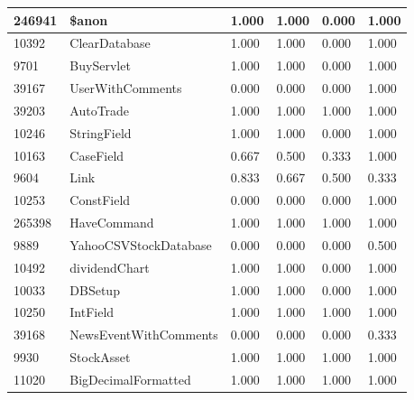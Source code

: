 \documentclass[a4paper]{article}
\newlength{\DUtablewidth} %
\begin{document}
\begin{longtable*}[c]{|p{0.160\DUtablewidth}|p{0.160\DUtablewidth}|p{0.160\DUtablewidth}|p{0.160\DUtablewidth}|p{0.160\DUtablewidth}|p{0.160\DUtablewidth}|}
246941
 & 
\$anon
 & 
1.000
 & 
1.000
 & 
0.000
 & 
1.000
 \\
\hline

10392
 & 
ClearDatabase
 & 
1.000
 & 
1.000
 & 
0.000
 & 
1.000
 \\
\hline

9701
 & 
BuyServlet
 & 
1.000
 & 
1.000
 & 
0.000
 & 
1.000
 \\
\hline

39167
 & 
UserWithComments
 & 
0.000
 & 
0.000
 & 
0.000
 & 
1.000
 \\
\hline

39203
 & 
AutoTrade
 & 
1.000
 & 
1.000
 & 
1.000
 & 
1.000
 \\
\hline

10246
 & 
StringField
 & 
1.000
 & 
1.000
 & 
0.000
 & 
1.000
 \\
\hline

10163
 & 
CaseField
 & 
0.667
 & 
0.500
 & 
0.333
 & 
1.000
 \\
\hline

9604
 & 
Link
 & 
0.833
 & 
0.667
 & 
0.500
 & 
0.333
 \\
\hline

10253
 & 
ConstField
 & 
0.000
 & 
0.000
 & 
0.000
 & 
1.000
 \\
\hline

265398
 & 
HaveCommand
 & 
1.000
 & 
1.000
 & 
1.000
 & 
1.000
 \\
\hline

9889
 & 
YahooCSVStockDatabase
 & 
0.000
 & 
0.000
 & 
0.000
 & 
0.500
 \\
\hline

10492
 & 
dividendChart
 & 
1.000
 & 
1.000
 & 
0.000
 & 
1.000
 \\
\hline

10033
 & 
DBSetup
 & 
1.000
 & 
1.000
 & 
0.000
 & 
1.000
 \\
\hline

10250
 & 
IntField
 & 
1.000
 & 
1.000
 & 
1.000
 & 
1.000
 \\
\hline

39168
 & 
NewsEventWithComments
 & 
0.000
 & 
0.000
 & 
0.000
 & 
0.333
 \\
\hline

9930
 & 
StockAsset
 & 
1.000
 & 
1.000
 & 
1.000
 & 
1.000
 \\
\hline

11020
 & 
BigDecimalFormatted
 & 
1.000
 & 
1.000
 & 
1.000
 & 
1.000
 \\
\hline


\end{longtable*}
\end{document}
